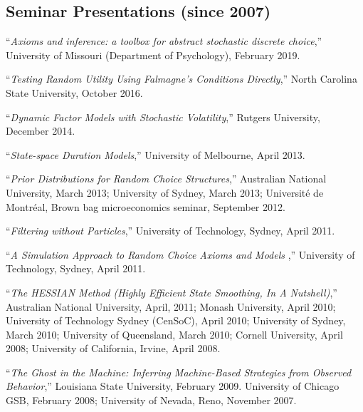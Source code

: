 \documentclass[12pt]{article}
\begin{document}



\subsection*{Seminar Presentations (since 2007)}

``{\it Axioms and inference: a toolbox for abstract stochastic discrete choice},''
University of Missouri (Department of Psychology), February 2019.

``{\it Testing Random Utility Using Falmagne's Conditions Directly},''
North Carolina State University, October 2016.

``{\it Dynamic Factor Models with Stochastic Volatility},''
Rutgers University, December 2014.

``{\it State-space Duration Models},''
University of Melbourne, April 2013.

``{\it Prior Distributions for Random Choice Structures},''
Australian National University, March 2013;
University of Sydney, March 2013;
Universit\'e de Montr\'eal, Brown bag microeconomics seminar, September 2012.

``{\it Filtering without Particles},''
University of Technology, Sydney, April 2011.

``{\it A Simulation Approach to Random Choice Axioms and Models },''
University of Technology, Sydney, April 2011.

``{\it The HESSIAN Method (Highly Efficient State Smoothing, In A Nutshell)},''
Australian National University, April, 2011;
Monash University, April 2010;
University of Technology Sydney (CenSoC), April 2010;
University of Sydney, March 2010;
University of Queensland, March 2010;
Cornell University, April 2008;
University of California, Irvine, April 2008.

``{\it The Ghost in the Machine: Inferring Machine-Based Strategies from Observed Behavior},'' 
Louisiana State University, February 2009.
University of Chicago GSB, February 2008;
University of Nevada, Reno, November 2007.
\end{document}
